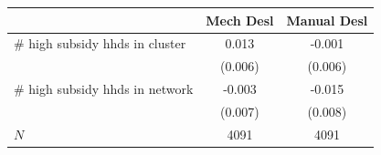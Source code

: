 \begin{tabular}{lcc}
\hline\hline
 & Mech Desl & Manual Desl \\
\hline
# high subsidy hhds in cluster & 0.013 & -0.001 \\
 & (0.006) & (0.006) \\
# high subsidy hhds in network & -0.003 & -0.015 \\
 & (0.007) & (0.008) \\
\hline
$N$ & 4091 & 4091 \\
\hline\hline
\end{tabular}
